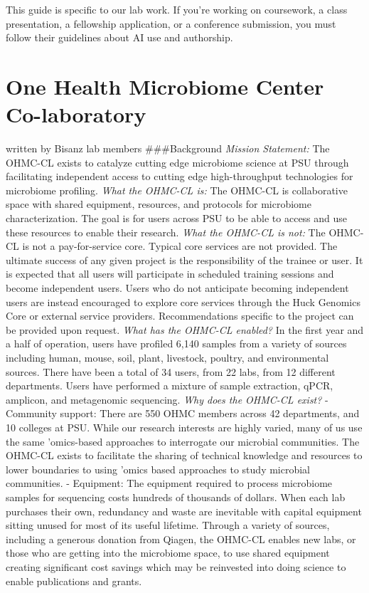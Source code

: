 \documentclass[
]{book}
\begin{document}
This guide is specific to our lab work. If you're working on coursework, a class presentation, a fellowship application, or a conference submission, you must follow their guidelines about AI use and authorship.

\section{One Health Microbiome Center Co-laboratory}\label{one-health-microbiome-center-co-laboratory}

written by Bisanz lab members
\#\#\#Background
\emph{Mission Statement:} The OHMC-CL exists to catalyze cutting edge microbiome science at PSU through facilitating independent access to cutting edge high-throughput technologies for microbiome profiling.
\emph{What the OHMC-CL is:} The OHMC-CL is collaborative space with shared equipment, resources, and protocols for microbiome characterization. The goal is for users across PSU to be able to access and use these resources to enable their research.
\emph{What the OHMC-CL is not:} The OHMC-CL is not a pay-for-service core. Typical core services are not provided. The ultimate success of any given project is the responsibility of the trainee or user. It is expected that all users will participate in scheduled training sessions and become independent users. Users who do not anticipate becoming independent users are instead encouraged to explore core services through the Huck Genomics Core or external service providers. Recommendations specific to the project can be provided upon request.
\emph{What has the OHMC-CL enabled?} In the first year and a half of operation, users have profiled 6,140 samples from a variety of sources including human, mouse, soil, plant, livestock, poultry, and environmental sources. There have been a total of 34 users, from 22 labs, from 12 different departments. Users have performed a mixture of sample extraction, qPCR, amplicon, and metagenomic sequencing.
\emph{Why does the OHMC-CL exist?}
- Community support: There are 550 OHMC members across 42 departments, and 10 colleges at
PSU. While our research interests are highly varied, many of us use the same 'omics-based
approaches to interrogate our microbial communities. The OHMC-CL exists to facilitate the sharing of technical knowledge and resources to lower boundaries to using 'omics based approaches to study microbial communities.
- Equipment: The equipment required to process microbiome samples for sequencing costs hundreds of thousands of dollars. When each lab purchases their own, redundancy and waste are inevitable with capital equipment sitting unused for most of its useful lifetime. Through a variety of sources, including a generous donation from Qiagen, the OHMC-CL enables new labs, or those who are getting into the microbiome space, to use shared equipment creating significant cost savings which may be reinvested into doing science to enable publications and grants.
\end{document}
